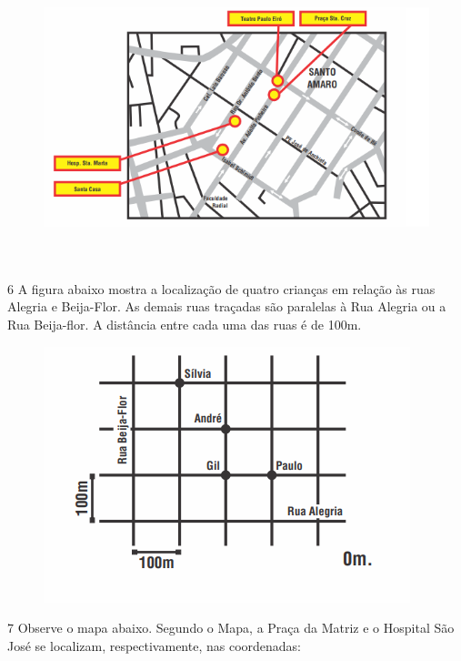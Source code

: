 \begin{figure}[h]
\centering\includegraphics[width=5.90625in,height=3.34375in]{./imgSAEB_6_MAT/media/image68.png}
\end{figure}


\num{6}  A figura abaixo mostra a localização de quatro crianças em relação às
ruas Alegria e Beija-Flor. As demais ruas traçadas são paralelas à Rua
Alegria ou a Rua Beija-flor. A distância entre cada uma das ruas é de
100m.

\begin{figure}[h]
\centering\includegraphics[width=4.19792in,height=2.93056in]{./imgSAEB_6_MAT/media/image69.png}
\end{figure}


\num{7}  Observe o mapa abaixo. Segundo o Mapa, a Praça da Matriz e o Hospital São José se localizam,
respectivamente, nas coordenadas:

